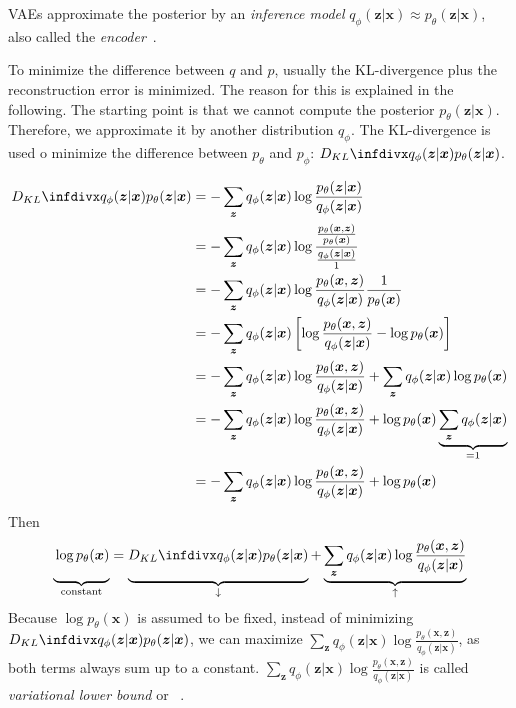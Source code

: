 \acp{VAE} approximate the posterior by an \textit{inference model} $q_\phi(\bm{z}|\bm{x}) \approx p_\theta(\bm{z}|\bm{x})$, also called the \textit{encoder}~\citep[p. 15]{kingma2019introduction}.

To minimize the difference between $q$ and $p$, usually the \ac{KL-divergence} plus the reconstruction error is minimized.
The reason for this is explained in the following.
The starting point is that we cannot compute the posterior $p_\theta(\bm{z}|\bm{x})$.
Therefore, we approximate it by another distribution $q_\phi$.
The \ac{KL-divergence} is used o minimize the difference between $p_{\theta}$ and $p_{\phi}$: $\kldiv{q_\phi(\bm{z}|\bm{x})}{p_\theta(\bm{z}|\bm{x})}$.

\begin{align}
    \kldiv{q_\phi(\bm{z}|\bm{x})}{p_\theta(\bm{z}|\bm{x})} &= -\sum_{\bm{z}} q_\phi(\bm{z}|\bm{x}) \log \frac{p_\theta(\bm{z}|\bm{x})}{q_\phi(\bm{z}|\bm{x})} \\
    &= -\sum_{\bm{z}} q_\phi(\bm{z}|\bm{x}) \log \frac{\frac{p_\theta(\bm{x},\bm{z})}{p_\theta(\bm{x})}}{\frac{q_\phi(\bm{z}|\bm{x})}{1}}\\
    &= -\sum_{\bm{z}} q_\phi(\bm{z}|\bm{x}) \log \frac{p_\theta(\bm{x},\bm{z})}{q_\phi(\bm{z}|\bm{x})}\frac{1}{p_\theta(\bm{x})}\\
    &= -\sum_{\bm{z}} q_\phi(\bm{z}|\bm{x}) \left[ \log \frac{p_\theta(\bm{x},\bm{z})}{q_\phi(\bm{z}|\bm{x})} - \log p_\theta(\bm{x}) \right]\\
    &= -\sum_{\bm{z}} q_\phi(\bm{z}|\bm{x}) \log \frac{p_\theta(\bm{x},\bm{z})}{q_\phi(\bm{z}|\bm{x})} + \sum_{\bm{z}} q_\phi(\bm{z}|\bm{x}) \log p_\theta(\bm{x}) \\
    &= -\sum_{\bm{z}} q_\phi(\bm{z}|\bm{x}) \log \frac{p_\theta(\bm{x},\bm{z})}{q_\phi(\bm{z}|\bm{x})} + \log p_\theta(\bm{x}) \underbrace{\sum_{\bm{z}} q_\phi(\bm{z}|\bm{x})}_{=1} \\
    &= -\sum_{\bm{z}} q_\phi(\bm{z}|\bm{x}) \log \frac{p_\theta(\bm{x},\bm{z})}{q_\phi(\bm{z}|\bm{x})} + \log p_\theta(\bm{x})
\end{align}
Then
\begin{align}
    \underbrace{\vphantom{\sum_{\bm{z}} x}\log p_\theta(\bm{x})}_{\text{constant}} =  \underbrace{\vphantom{\sum_{\bm{z}} x}\kldiv{q_\phi(\bm{z}|\bm{x})}{p_\theta(\bm{z}|\bm{x})}}_{\downarrow}  + \underbrace{\sum_{\bm{z}} q_\phi(\bm{z}|\bm{x}) \log \frac{p_\theta(\bm{x},\bm{z})}{q_\phi(\bm{z}|\bm{x})}}_{\uparrow}
\end{align}
Because $\log p_\theta(\bm{x})$ is assumed to be fixed, instead of minimizing $\kldiv{q_\phi(\bm{z}|\bm{x})}{p_\theta(\bm{z}|\bm{x})}$, we can maximize $\sum_{\bm{z}} q_\phi(\bm{z}|\bm{x}) \log \frac{p_\theta(\bm{x},\bm{z})}{q_\phi(\bm{z}|\bm{x})}$, as both terms always sum up to a constant.
$\sum_{\bm{z}} q_\phi(\bm{z}|\bm{x}) \log \frac{p_\theta(\bm{x},\bm{z})}{q_\phi(\bm{z}|\bm{x})}$ is called \textit{variational lower bound} or ~\citep[p. 18]{kingma2019introduction}.

